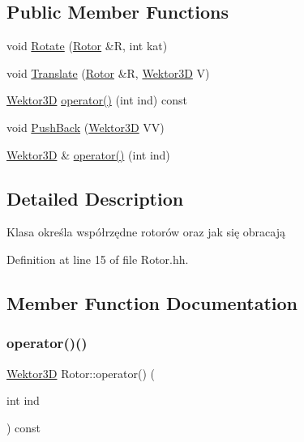 \subsection*{Public Member Functions}
\begin{DoxyCompactItemize}
\item 
void \hyperlink{class_rotor_a021ab148b8734f0a82d502c999dd41be}{Rotate} (\hyperlink{class_rotor}{Rotor} \&R, int kat)
\item 
void \hyperlink{class_rotor_a1f00a40e0e40e8f8cf7cb15160c88cc2}{Translate} (\hyperlink{class_rotor}{Rotor} \&R, \hyperlink{_wektor3_d_8hh_ac353a272b38b4ad342f7181ad7bdb91a}{Wektor3D} V)
\item 
\hyperlink{_wektor3_d_8hh_ac353a272b38b4ad342f7181ad7bdb91a}{Wektor3D} \hyperlink{class_rotor_a10b8d092c1604fbef24ee2c5977c26ae}{operator()} (int ind) const
\item 
void \hyperlink{class_rotor_a987eda3f97cef17d1201057078185ad6}{Push\+Back} (\hyperlink{_wektor3_d_8hh_ac353a272b38b4ad342f7181ad7bdb91a}{Wektor3D} VV)
\item 
\hyperlink{_wektor3_d_8hh_ac353a272b38b4ad342f7181ad7bdb91a}{Wektor3D} \& \hyperlink{class_rotor_ad43dd1c9b8def16cdbae6b12b4968f23}{operator()} (int ind)
\end{DoxyCompactItemize}


\subsection{Detailed Description}
Klasa określa współrzędne rotorów oraz jak się obracają 

Definition at line 15 of file Rotor.\+hh.



\subsection{Member Function Documentation}
\mbox{\label{class_rotor_a10b8d092c1604fbef24ee2c5977c26ae}} 
\subsubsection{\texorpdfstring{operator()()}{operator()()}\hspace{0.1cm}{\footnotesize\ttfamily [1/2]}}
{\footnotesize\ttfamily \hyperlink{_wektor3_d_8hh_ac353a272b38b4ad342f7181ad7bdb91a}{Wektor3D} Rotor\+::operator() (\begin{DoxyParamCaption}\item[{int}]{ind }\end{DoxyParamCaption}) const\hspace{0.3cm}{\ttfamily [inline]}}




